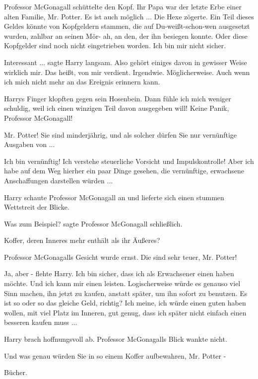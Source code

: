 Professor McGonagall schüttelte den Kopf. \glqq{}Ihr Papa war der letzte Erbe
einer alten Familie, Mr. Potter. Es ist auch möglich ...\grqq{} Die Hexe
zögerte. \glqq{}Ein Teil dieses Geldes könnte von Kopfgeldern stammen, die auf
Du-weißt-schon-wen ausgesetzt wurden, zahlbar an seinen Mör- ah, an den, der ihn
besiegen konnte. Oder diese Kopfgelder sind noch nicht eingetrieben worden. Ich
bin mir nicht sicher.\grqq{}

\glqq{}Interessant ...\grqq{} sagte Harry langsam. \glqq{}Also gehört einiges davon
in gewisser Weise wirklich mir. Das heißt, von mir verdient. Irgendwie.
Möglicherweise. Auch wenn ich mich nicht mehr an das Ereignis erinnern
kann.\grqq{}

Harrys Finger klopften gegen sein Hosenbein. \glqq{}Dann fühle ich mich weniger
schuldig, weil ich einen winzigen Teil davon ausgegeben will! Keine Panik,
Professor McGonagall!\grqq{}

\glqq{}Mr. Potter! Sie sind minderjährig, und als solcher dürfen Sie nur
vernünftige Ausgaben von ...\grqq{}

\glqq{}Ich bin vernünftig! Ich verstehe steuerliche Vorsicht und Impulskontrolle!
Aber ich habe auf dem Weg hierher ein paar Dinge gesehen, die vernünftige,
erwachsene Anschaffungen darstellen würden ...\grqq{}

Harry schaute Professor McGonagall an und lieferte sich einen stummen Wettstreit
der Blicke.

\glqq{}Was zum Beispiel?\grqq{} sagte Professor McGonagall schließlich.

\glqq{}Koffer, deren Inneres mehr enthält als ihr Äußeres?\grqq{}

Professor McGonagalls Gesicht wurde ernst. \glqq{}Die sind sehr teuer, Mr.
Potter!\grqq{}

\glqq{}Ja, aber -\grqq{} flehte Harry. \glqq{}Ich bin sicher, dass ich als
Erwachsener einen haben möchte. Und ich kann mir einen leisten. Logischerweise
würde es genauso viel Sinn machen, ihn jetzt zu kaufen, anstatt später, um ihn
sofort zu benutzen. Es ist so oder so das gleiche Geld, richtig? Ich meine, ich
würde einen guten haben wollen, mit viel Platz im Inneren, gut genug, dass ich
später nicht einfach einen besseren kaufen muss ...\grqq{}

Harry brach hoffnungsvoll ab. Professor McGonagalls Blick wankte nicht.

\glqq{}Und was genau würden Sie in so einem Koffer aufbewahren, Mr. Potter
-\grqq{}

\glqq{}Bücher.\grqq{}

